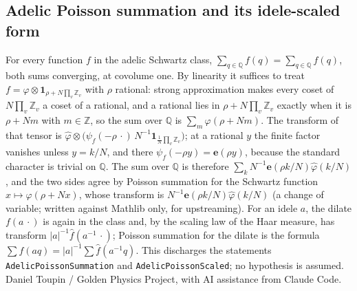 \documentclass{report}
\theoremstyle{definition}
\begin{document}
\begin{itemize}
\begin{itemize}
\section{Adelic Poisson summation and its idele-scaled form}
For every function $f$ in the adelic Schwartz class, $\sum_{q\in\mathbb Q}f(q)=\sum_{q\in\mathbb Q}\hat f(q)$, both sums converging, at covolume one. By linearity it suffices to treat $f=\varphi\otimes\mathbf 1_{\rho+N\prod_v\mathbb Z_v}$ with $\rho$ rational: strong approximation makes every coset of $N\prod_v\mathbb Z_v$ a coset of a rational, and a rational lies in $\rho+N\prod_v\mathbb Z_v$ exactly when it is $\rho+Nm$ with $m\in\mathbb Z$, so the sum over $\mathbb Q$ is $\sum_m\varphi(\rho+Nm)$. The transform of that tensor is $\hat\varphi\otimes\bigl(\psi_f(-\rho\,\cdot)\,N^{-1}\mathbf 1_{\frac1N\prod_v\mathbb Z_v}\bigr)$; at a rational $y$ the finite factor vanishes unless $y=k/N$, and there $\psi_f(-\rho y)=\mathbf e(\rho y)$, because the standard character is trivial on $\mathbb Q$. The sum over $\mathbb Q$ is therefore $\sum_k N^{-1}\mathbf e(\rho k/N)\hat\varphi(k/N)$, and the two sides agree by Poisson summation for the Schwartz function $x\mapsto\varphi(\rho+Nx)$, whose transform is $N^{-1}\mathbf e(\rho k/N)\hat\varphi(k/N)$ (a change of variable; written against Mathlib only, for upstreaming). For an idele $a$, the dilate $f(a\,\cdot)$ is again in the class and, by the scaling law of the Haar measure, has transform $|a|^{-1}\hat f(a^{-1}\,\cdot)$; Poisson summation for the dilate is the formula $\sum f(aq)=|a|^{-1}\sum\hat f(a^{-1}q)$. This discharges the statements \texttt{AdelicPoissonSummation} and \texttt{AdelicPoissonScaled}; no hypothesis is assumed.
Daniel Toupin / Golden Physics Project, with AI assistance from Claude Code.



\end{itemize}
\end{itemize}
\end{document}
